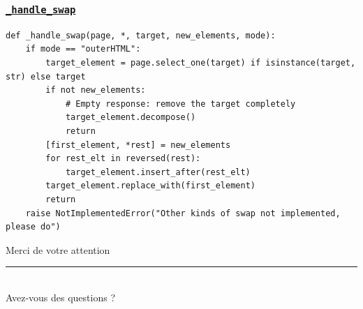 \documentclass{beamer}
\begin{document}
\begin{frame}[fragile]
    \frametitle{\href{https://github.com/gip-inclusion/les-emplois/blob/9d800e6b3c8a814f17303157966830a0411db8e5/tests/utils/htmx/test.py\#L37}{\texttt{\_handle\_swap}}}
    \begin{verbatim}
def _handle_swap(page, *, target, new_elements, mode):
    if mode == "outerHTML":
        target_element = page.select_one(target) if isinstance(target, str) else target
        if not new_elements:
            # Empty response: remove the target completely
            target_element.decompose()
            return
        [first_element, *rest] = new_elements
        for rest_elt in reversed(rest):
            target_element.insert_after(rest_elt)
        target_element.replace_with(first_element)
        return
    raise NotImplementedError("Other kinds of swap not implemented, please do")
    \end{verbatim}
\end{frame}

\begin{frame}[focus]
    Merci de votre attention
    \\
    \vspace{20pt}
    \rule{\textwidth}{1pt}
    \\
    \vspace{30pt}
    Avez-vous des questions ?
\end{frame}
\end{document}
